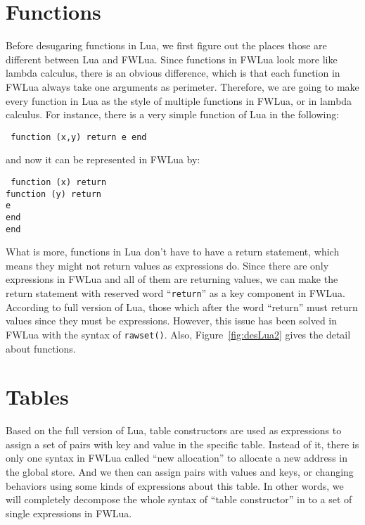 \section{Functions}
Before desugaring functions in Lua, we first figure out the places those are different between Lua and FWLua. Since functions in FWLua look more like lambda calculus, there is an obvious difference, which is that each function in FWLua always take one arguments as perimeter. Therefore, we are going to make every function in Lua as the style of multiple functions in FWLua, or in lambda calculus. For instance, there is a very simple function of Lua in the following:
\begin{flushleft}
{\tt
function (x,y) return e end
}
\end{flushleft}
and now it can be represented in FWLua by:
\begin{flushleft}
{\tt
function (x) return \\
\quad  function (y) return \\
\quad\quad e \\
\quad end \\
end \\
}
\end{flushleft}

What is more, functions in Lua don't have to have a return statement, which means they might not return values as expressions do. Since there are only expressions in FWLua and all of them are returning values, we can make the return statement with reserved word ``{\tt return}'' as a key component in FWLua. According to full version of Lua, those which after the word ``return'' must return values since they must be expressions. However, this issue has been solved in FWLua with the syntax of {\tt rawset()}. Also, Figure~\ref{fig:desLua2} gives the detail about functions.

\section{Tables}\label{sec:TranslateTabls}
Based on the full version of Lua, table constructors are used as expressions to assign a set of pairs with key and value in the specific table. Instead of it, there is only one syntax in FWLua called ``new allocation'' to allocate a new address in the global store. And we then can assign pairs with values and keys, or changing behaviors using some kinds of expressions about this table. In other words, we will completely decompose the whole syntax of ``table constructor'' in to a set of single expressions in FWLua. 

